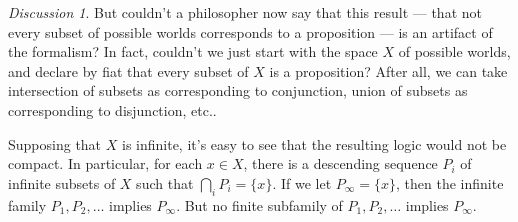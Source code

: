 \documentclass[11pt]{article}
\theoremstyle{definition}
\theoremstyle{remark}
\newtheorem*{disc}{Discussion}
\begin{document}
\begin{disc}
But couldn't a philosopher now say that this result --- that not every
subset of possible worlds corresponds to a proposition --- is an
artifact of the formalism?  In fact, couldn't we just start with the
space $X$ of possible worlds, and declare by fiat that every subset of
$X$ is a proposition?  After all, we can take intersection of subsets
as corresponding to conjunction, union of subsets as corresponding to
disjunction, etc..  

Supposing that $X$ is infinite, it's easy to see that the resulting
logic would not be compact.  In particular, for each $x\in X$, there
is a descending sequence $P_i$ of infinite subsets of $X$ such that
$\bigcap _iP_i=\{ x\}$.  If we let $P_\infty = \{ x\}$, then the
infinite family $P_1,P_2,\dots $ implies $P_\infty$.  But no finite
subfamily of $P_1,P_2,\dots $ implies $P_\infty$.
\end{disc}
\end{document}
